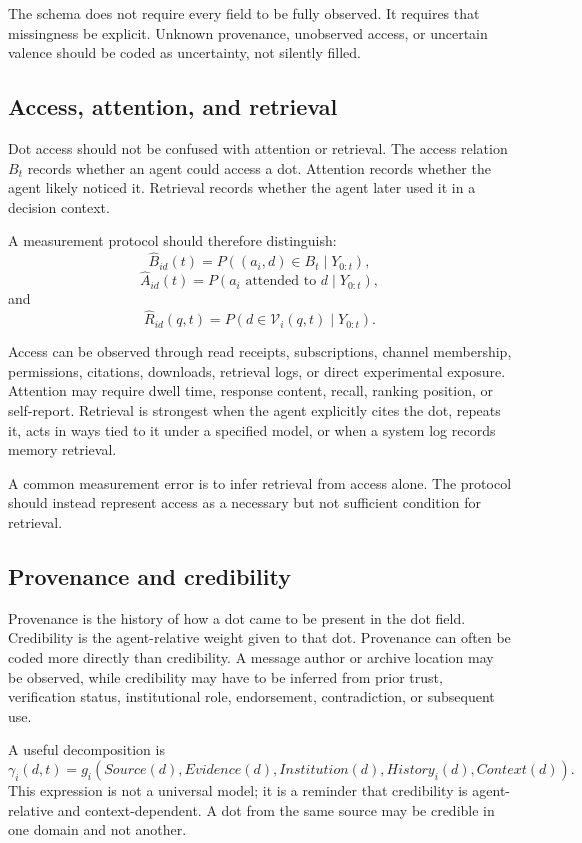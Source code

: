 \documentclass[11pt]{article}
\theoremstyle{remark}
\begin{document}
The schema does not require every field to be fully observed. It requires
that missingness be explicit. Unknown provenance, unobserved access, or
uncertain valence should be coded as uncertainty, not silently filled.

\subsection{Access, attention, and retrieval}\label{access-attention-retrieval-measurement}

Dot access should not be confused with attention or retrieval. The access
relation \(B_t\) records whether an agent could access a dot. Attention
records whether the agent likely noticed it. Retrieval records whether the
agent later used it in a decision context.

A measurement protocol should therefore distinguish:
\[
\widehat B_{id}(t)=P((a_i,d)\in B_t\mid Y_{0:t}),
\]
\[
\widehat A_{id}(t)=P(a_i\text{ attended to }d\mid Y_{0:t}),
\]
and
\[
\widehat R_{id}(q,t)=P(d\in \mathcal V_i(q,t)\mid Y_{0:t}).
\]

Access can be observed through read receipts, subscriptions, channel
membership, permissions, citations, downloads, retrieval logs, or direct
experimental exposure. Attention may require dwell time, response
content, recall, ranking position, or self-report. Retrieval is strongest
when the agent explicitly cites the dot, repeats it, acts in ways tied to
it under a specified model, or when a system log records memory retrieval.

A common measurement error is to infer retrieval from access alone. The
protocol should instead represent access as a necessary but not sufficient
condition for retrieval.

\subsection{Provenance and credibility}\label{provenance-credibility-measurement}

Provenance is the history of how a dot came to be present in the dot
field. Credibility is the agent-relative weight given to that dot.
Provenance can often be coded more directly than credibility. A message
author or archive location may be observed, while credibility may have to
be inferred from prior trust, verification status, institutional role,
endorsement, contradiction, or subsequent use.

A useful decomposition is
\[
\gamma_i(d,t)=g_i(Source(d),Evidence(d),Institution(d),History_i(d),Context(d)).
\]
This expression is not a universal model; it is a reminder that
credibility is agent-relative and context-dependent. A dot from the same
source may be credible in one domain and not another.
\end{document}
